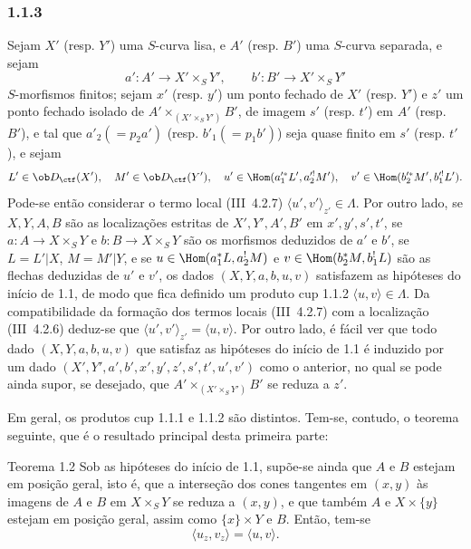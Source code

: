 \subsubsection*{1.1.3}
Sejam $X'$ (resp. $Y'$) uma $S$-curva lisa, e $A'$ (resp. $B'$) uma $S$-curva separada, e sejam
\[
a':A'\longrightarrow X'\times_S Y',
\qquad
b':B'\longrightarrow X'\times_S Y'
\]
$S$-morfismos finitos; sejam $x'$ (resp. $y'$) um ponto fechado de $X'$ (resp. $Y'$) e $z'$ um ponto fechado isolado de $A'\times_{(X'\times_S Y')}B'$, de imagem $s'$ (resp. $t'$) em $A'$ (resp. $B'$), e tal que $a'_2(=p_2a')$ (resp. $b'_1(=p_1b')$) seja quase finito em $s'$ (resp. $t'$), e sejam
\[
L'\in\ob D_{\ctf}(X'),\quad M'\in\ob D_{\ctf}(Y'),\quad
u'\in\Hom(a_1'^*L',a_2'^!M'),\quad v'\in\Hom(b_2'^*M',b_1'^!L').
\]
Pode-se então considerar o termo local (III~4.2.7) $\langle u',v'\rangle_{z'}\in\Lambda$. Por outro lado, se $X,Y,A,B$ são as localizações estritas de $X',Y',A',B'$ em $x',y',s',t'$, se $a:A\to X\times_S Y$ e $b:B\to X\times_SY$ são os morfismos deduzidos de $a'$ e $b'$, se $L=L'|X$, $M=M'|Y$, e se $u\in\Hom(a_1^*L,a_2^!M)$ e $v\in\Hom(b_2^*M,b_1^!L)$ são as flechas deduzidas de $u'$ e $v'$, os dados $(X,Y,a,b,u,v)$ satisfazem as hipóteses do início de 1.1, de modo que fica definido um produto cup 1.1.2 $\langle u,v\rangle\in\Lambda$. Da compatibilidade da formação dos termos locais (III~4.2.7) com a localização (III~4.2.6) deduz-se que $\langle u',v'\rangle_{z'}=\langle u,v\rangle$. Por outro lado, é fácil ver que todo dado $(X,Y,a,b,u,v)$ que satisfaz as hipóteses do início de 1.1 é induzido por um dado $(X',Y',a',b',x',y',z',s',t',u',v')$ como o anterior, no qual se pode ainda supor, se desejado, que $A'\times_{(X'\times_S Y')}B'$ se reduza a $z'$.

Em geral, os produtos cup 1.1.1 e 1.1.2 são distintos. Tem-se, contudo, o teorema seguinte, que é o resultado principal desta primeira parte:

\begin{statement}{Teorema 1.2}
Sob as hipóteses do início de 1.1, supõe-se ainda que $A$ e $B$ estejam em posição geral, isto é, que a interseção dos cones tangentes em $(x,y)$ às imagens de $A$ e $B$ em $X\times_S Y$ se reduza a $(x,y)$, e que também $A$ e $X\times\{y\}$ estejam em posição geral, assim como $\{x\}\times Y$ e $B$. Então, tem-se
\begin{equation}\tag{1.2.1}
\langle u_z,v_z\rangle=\langle u,v\rangle.
\end{equation}
\end{statement}

